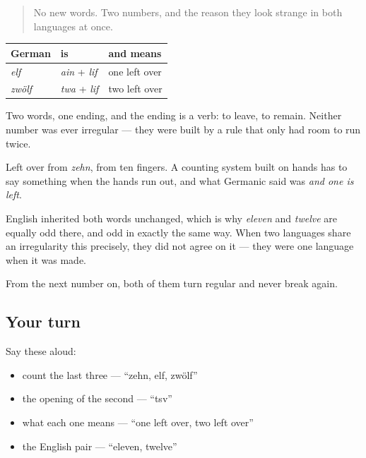 \label{lesson:GE-C12-elf-zwoelf}



\begin{quote}
No new words. Two numbers, and the reason they look strange in both languages at once.
\end{quote}

\begin{grammarlens}[title={Grammar Lens: what the two are made of}]
\noindent
\begin{tabularx}{\linewidth}{@{}>{\raggedright\arraybackslash}X>{\raggedright\arraybackslash}X>{\raggedright\arraybackslash}X@{}}
\toprule
\textbf{German} & \textbf{is} & \textbf{and means} \\
\midrule
\emph{elf} & \emph{ain} + \emph{lif} & one left over \\
\emph{zwölf} & \emph{twa} + \emph{lif} & two left over \\
\bottomrule
\end{tabularx}

Two words, one ending, and the ending is a verb: to leave, to remain. Neither number was ever irregular — they were built by a rule that only had room to run twice.
\end{grammarlens}

\begin{culture}
Left over from \emph{zehn}, from ten fingers. A counting system built on hands has to say something when the hands run out, and what Germanic said was \emph{and one is left}.

English inherited both words unchanged, which is why \emph{eleven} and \emph{twelve} are equally odd there, and odd in exactly the same way. When two languages share an irregularity this precisely, they did not agree on it — they were one language when it was made.

From the next number on, both of them turn regular and never break again.
\end{culture}

\subsection*{Your turn}
Say these aloud:

\begin{itemize}
\raggedright
  \item count the last three — \textquotedblleft{}zehn, elf, zwölf\textquotedblright{}
  \item the opening of the second — \textquotedblleft{}tsv\textquotedblright{}
  \item what each one means — \textquotedblleft{}one left over, two left over\textquotedblright{}
  \item the English pair — \textquotedblleft{}eleven, twelve\textquotedblright{}
\end{itemize}

